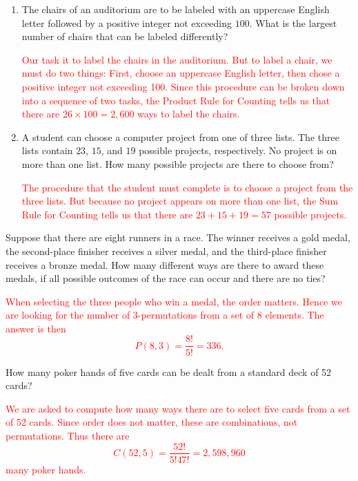 \documentclass[12pt,reqno]{amsart}
\begin{document}
\bigskip
\prob

\begin{enumerate}
\item The chairs of an auditorium are to be labeled with an uppercase English letter followed by a positive integer not exceeding $100$. What is the largest number of chairs that can be labeled differently?

\bigskip
\textcolor{red}{Our task it to label the chairs in the auditorium. But to label a chair, we must do two things: First, choose an uppercase English letter, then chose a positive integer not exceeding 100. Since this procedure can be broken down into a sequence of two tasks, the Product Rule for Counting tells us that there are $26 \times 100 = 2{,}600$ ways to label the chairs.}
\bigskip

\item A student can choose a computer project from one of three lists. The three lists contain $23$, $15$, and $19$ possible projects, respectively. No project is on more than one list. How many possible projects are there to choose from?

\bigskip
\textcolor{red}{The procedure that the student must complete is to choose a project from the three lists. But because no project appears on more than one list, the Sum Rule for Counting tells us that there are $23+15+19 = 57$ possible projects.}
\end{enumerate}









\bigskip
\prob Suppose that there are eight runners in a race. The winner receives a gold medal, the second-place finisher receives a silver medal, and the third-place finisher receives a bronze medal. How many different ways are there to award these medals, if all possible outcomes of the race can occur and there are no ties?

\bigskip
\textcolor{red}{When selecting the three people who win a medal, the order matters. Hence we are looking for the number of $3$-permutations from a set of $8$ elements. The answer is then
	\[P(8,3) = \frac{8!}{5!} = 336.
	\]}
\bigskip







\prob How many poker hands of five cards can be dealt from a standard deck of 52 cards?

\bigskip
\textcolor{red}{We are asked to compute how many ways there are to select five cards from a set of 52 cards. Since order does not matter, these are combinations, not permutations. Thus there are
	\[C(52,5) = \frac{52!}{5!47!} = 2,598,960
	\]
many poker hands.}
\bigskip
\end{document}
